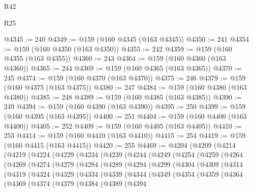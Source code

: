\begin{lexlean}{R42}
\begin{lexlean}{R25}
\begin{coremodule}
{{{{{{{{{{{{{{{{{{{{{{{{{{{{{{{{{{{{{{{{{{{{{{{{{{{{{{{{{{{{{{{{{{{{{{{{{{{{{{{{{{{{{{{{{{{{{{{{{{{{{{{{{{{{{{{{{{{{{{{{{{{{{{{{{{{{{{{{{{{{{{{{{{{{{{{{{{{{{{{{{{{{{{{{{{{{{{{{{{{{{{{{{{{{{{{{{{{{{{{@4345 := 240
@4349 := @159 (@160 @4345 (@163 @4345))
@4350 := 241
@4354 := @159 (@160 @4350 (@163 @4350))
@4355 := 242
@4359 := @159 (@160 @4355 (@163 @4355))
@4360 := 243
@4364 := @159 (@160 @4360 (@163 @4360))
@4365 := 244
@4369 := @159 (@160 @4365 (@163 @4365))
@4370 := 245
@4374 := @159 (@160 @4370 (@163 @4370))
@4375 := 246
@4379 := @159 (@160 @4375 (@163 @4375))
@4380 := 247
@4384 := @159 (@160 @4380 (@163 @4380))
@4385 := 248
@4389 := @159 (@160 @4385 (@163 @4385))
@4390 := 249
@4394 := @159 (@160 @4390 (@163 @4390))
@4395 := 250
@4399 := @159 (@160 @4395 (@163 @4395))
@4400 := 251
@4404 := @159 (@160 @4400 (@163 @4400))
@4405 := 252
@4409 := @159 (@160 @4405 (@163 @4405))
@4410 := 253
@4414 := @159 (@160 @4410 (@163 @4410))
@4415 := 254
@4419 := @159 (@160 @4415 (@163 @4415))
@4420 := 255
@4469 := @4204
    (@4209
      (@4214
        (@4219
          (@4224
            (@4229
              (@4234
                (@4239
                  (@4244
                    (@4249
                      (@4254
                        (@4259
                          (@4264
                            (@4269
                              (@4274
                                (@4279
                                  (@4284
                                    (@4289
                                      (@4294
                                        (@4299
                                          (@4304
                                            (@4309
                                              (@4314
                                                (@4319
                                                  (@4324
                                                    (@4329
                                                      (@4334
                                                        (@4339
                                                          (@4344
                                                            (@4349
                                                              (@4354
                                                                (@4359
                                                                  (@4364
                                                                    (@4369
                                                                      (@4374
                                                                        (@4379
                                                                          (@4384
                                                                            (@4389
                                                                              (@4394
}}}}}}}}}}}}}}}}}}}}}}}}}}}}}}}}}}}}}}}}}}}}}}}}}}}}}}}}}}}}}}}}}}}}}}}}}}}}}}}}}}}}}}}}}}}}}}}}}}}}}}}}}}}}}}}}}}}}}}}}}}}}}}}}}}}}}}}}}}}}}}}}}}}}}}}}}}}}}}}}}}}}}}}}}}}}}}}}}}}}}}}}}}}}}}}}}}}}}}}
\end{coremodule}
\end{lexlean}
\end{lexlean}
